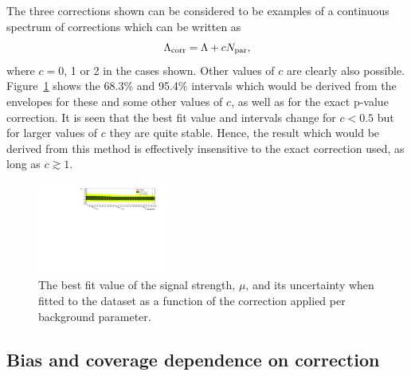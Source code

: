 The three corrections shown can be
considered to be examples of a continuous spectrum of corrections which can
be written as
\begin{displaymath}
\Lambda_{\mathrm{corr}} = \textrm{\ensuremath{\Lambda}} + cN_{\rm par},
\end{displaymath}
where $c=0$, 1 or 2 in the cases shown. Other values of $c$ are clearly
also possible.
Figure~\ref{fig:correction:correction} shows the
68.3\% and 95.4\% intervals which would be derived from the envelopes
for these and
some other values of $c$, as well as for the exact p-value correction.
It is seen that the best fit value and intervals change for $c<0.5$ but
for larger values of $c$ they are quite stable. Hence, the result which would
be derived from this method is effectively insensitive to the exact correction
used, as long as $c \gtrsim 1$.
%
\begin{figure}[htp]
\centering
\includegraphics[angle=90,width=0.38\textwidth]{correction/correction.pdf}
\caption{The best fit value of the signal strength, $\mu$, and its uncertainty when fitted to the dataset as a function of the correction applied per background parameter.}
\label{fig:correction:correction}
\end{figure}





\subsection{Bias and coverage dependence on correction}
\label{sec:correction:bias}

